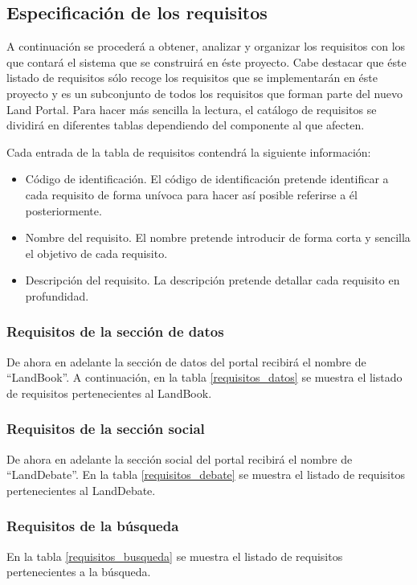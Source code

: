 \subsection{Especificación de los requisitos}
A continuación se procederá a obtener, analizar y organizar los requisitos con los que contará el sistema que se construirá en éste proyecto.  Cabe destacar que éste listado de requisitos sólo recoge los requisitos que se implementarán en éste proyecto y es un subconjunto de todos los requisitos que forman parte del nuevo Land Portal.\newline
Para hacer más sencilla la lectura, el catálogo de requisitos se dividirá en diferentes tablas dependiendo del componente al que afecten.

Cada entrada de la tabla de requisitos contendrá la siguiente información:
\begin{itemize}
\item Código de identificación. El código de identificación pretende identificar a cada requisito de forma unívoca para hacer así posible referirse a él posteriormente.
\item Nombre del requisito. El nombre pretende introducir de forma corta y sencilla el objetivo de cada requisito.
\item Descripción del requisito. La descripción pretende detallar cada requisito en profundidad.
\end{itemize}

\subsubsection{Requisitos de la sección de datos}
De ahora en adelante la sección de datos del portal recibirá el nombre de ``LandBook''.  A continuación, en la tabla  \ref{requisitos_datos} se muestra el listado de requisitos pertenecientes al LandBook.


\subsubsection{Requisitos de la sección social}
De ahora en adelante la sección social del portal recibirá el nombre de ``LandDebate''.  En la tabla \ref{requisitos_debate} se muestra el listado de requisitos pertenecientes al LandDebate.


\subsubsection{Requisitos de la búsqueda}
En la tabla \ref{requisitos_busqueda} se muestra el listado de requisitos pertenecientes a la búsqueda.


